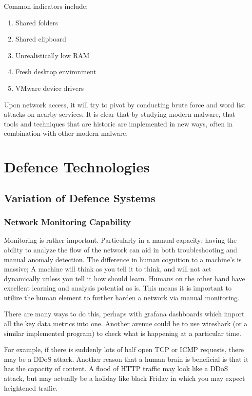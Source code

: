 Common indicators include:
\begin{enumerate}
    \item Shared folders
    \item Shared clipboard
    \item Unrealistically low RAM
    \item Fresh desktop environment
    \item VMware device drivers
\end{enumerate}

Upon network access, it will try to pivot by conducting brute force and word list attacks on nearby services. It is clear that by studying modern malware, that tools and techniques that are historic are implemented in new ways, often in combination with other modern malware.



\chapter{Defence Technologies}
\section{Variation of Defence Systems}
\subsection{Network Monitoring Capability}
Monitoring is rather important. Particularly in a manual capacity; having the ability to analyze the flow of the network can aid in both troubleshooting and manual anomaly detection. The difference in human cognition to a machine's is massive; A machine will think as you tell it to think,
and will not act dynamically unless you tell it how should learn. Humans on the other hand have excellent learning and analysis potential as is. This means it is important to utilize the human element to further harden a network via manual monitoring. 

There are many ways to do this, perhaps with grafana dashboards which import all the key data metrics into one. Another avenue could be to use wireshark (or a similar implemented program) to check what is happening at a particular time. 

For example, if there is suddenly lots of half open TCP or ICMP requests, there may be a DDoS attack. Another reason that a human brain is beneficial is that it has the capacity of content. A flood of HTTP traffic may look like a DDoS attack, 
but may actually be a holiday like black Friday in which you may expect heightened traffic.

